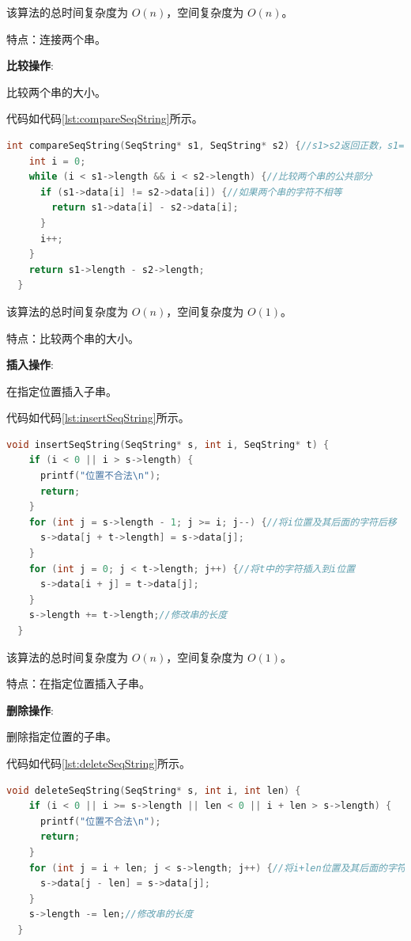 \documentclass[lang=cn,newtx,10pt,scheme=chinese]{elegantbook}
\begin{document}
该算法的总时间复杂度为 $O(n)$，空间复杂度为 $O(n)$。

特点：连接两个串。

\textbf{比较操作}:

比较两个串的大小。

代码如代码\ref{lst:compareSeqString}所示。

\begin{lstlisting}[language=C++, caption={比较两个串的大小示例代码}, label={lst:compareSeqString}]
  int compareSeqString(SeqString* s1, SeqString* s2) {//s1>s2返回正数，s1=s2返回0，s1<s2返回负数
    int i = 0;
    while (i < s1->length && i < s2->length) {//比较两个串的公共部分
      if (s1->data[i] != s2->data[i]) {//如果两个串的字符不相等
        return s1->data[i] - s2->data[i];
      }
      i++;
    }
    return s1->length - s2->length;
  }

\end{lstlisting}

该算法的总时间复杂度为 $O(n)$，空间复杂度为 $O(1)$。

特点：比较两个串的大小。

\textbf{插入操作}:

在指定位置插入子串。

代码如代码\ref{lst:insertSeqString}所示。

\begin{lstlisting}[language=C++, caption={在指定位置插入子串示例代码}, label={lst:insertSeqString}]
  void insertSeqString(SeqString* s, int i, SeqString* t) {
    if (i < 0 || i > s->length) {
      printf("位置不合法\n");
      return;
    }
    for (int j = s->length - 1; j >= i; j--) {//将i位置及其后面的字符后移
      s->data[j + t->length] = s->data[j];
    }
    for (int j = 0; j < t->length; j++) {//将t中的字符插入到i位置
      s->data[i + j] = t->data[j];
    }
    s->length += t->length;//修改串的长度
  }

\end{lstlisting}

该算法的总时间复杂度为 $O(n)$，空间复杂度为 $O(1)$。

特点：在指定位置插入子串。

\textbf{删除操作}:

删除指定位置的子串。

代码如代码\ref{lst:deleteSeqString}所示。

\begin{lstlisting}[language=C++, caption={删除指定位置的子串示例代码}, label={lst:deleteSeqString}]
  void deleteSeqString(SeqString* s, int i, int len) {
    if (i < 0 || i >= s->length || len < 0 || i + len > s->length) {
      printf("位置不合法\n");
      return;
    }
    for (int j = i + len; j < s->length; j++) {//将i+len位置及其后面的字符前移
      s->data[j - len] = s->data[j];
    }
    s->length -= len;//修改串的长度
  }

\end{lstlisting}
\end{document}

